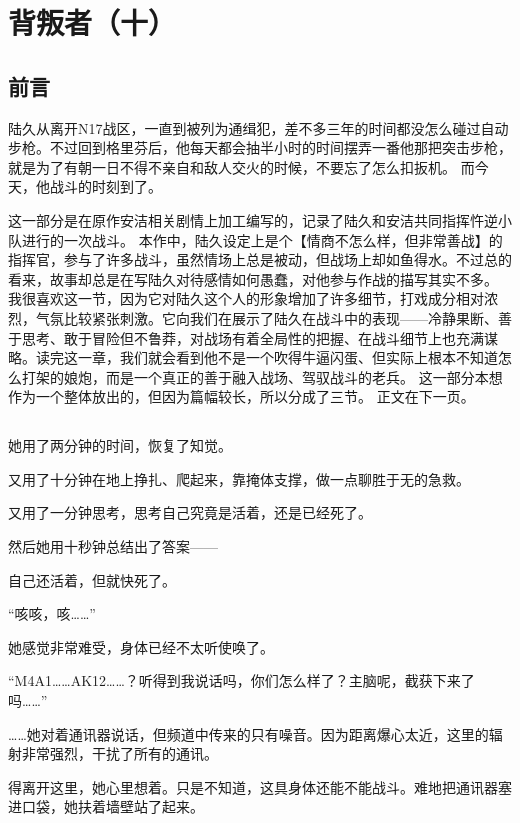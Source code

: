\chapter{背叛者（十）}

\section*{前言}
陆久从离开N17战区，一直到被列为通缉犯，差不多三年的时间都没怎么碰过自动步枪。不过回到格里芬后，他每天都会抽半小时的时间摆弄一番他那把突击步枪，就是为了有朝一日不得不亲自和敌人交火的时候，不要忘了怎么扣扳机。
而今天，他战斗的时刻到了。

\lineseparator


这一部分是在原作安洁相关剧情上加工编写的，记录了陆久和安洁共同指挥忤逆小队进行的一次战斗。
本作中，陆久设定上是个【情商不怎么样，但非常善战】的指挥官，参与了许多战斗，虽然情场上总是被动，但战场上却如鱼得水。不过总的看来，故事却总是在写陆久对待感情如何愚蠢，对他参与作战的描写其实不多。
我很喜欢这一节，因为它对陆久这个人的形象增加了许多细节，打戏成分相对浓烈，气氛比较紧张刺激。它向我们在展示了陆久在战斗中的表现——冷静果断、善于思考、敢于冒险但不鲁莽，对战场有着全局性的把握、在战斗细节上也充满谋略。读完这一章，我们就会看到他不是一个吹得牛逼闪蛋、但实际上根本不知道怎么打架的娘炮，而是一个真正的善于融入战场、驾驭战斗的老兵。
这一部分本想作为一个整体放出的，但因为篇幅较长，所以分成了三节。
正文在下一页。

\section*{}

她用了两分钟的时间，恢复了知觉。

又用了十分钟在地上挣扎、爬起来，靠掩体支撑，做一点聊胜于无的急救。

又用了一分钟思考，思考自己究竟是活着，还是已经死了。

然后她用十秒钟总结出了答案——

自己还活着，但就快死了。

“咳咳，咳……”

她感觉非常难受，身体已经不太听使唤了。

“M4A1……AK12……？听得到我说话吗，你们怎么样了？主脑呢，截获下来了吗……”

……她对着通讯器说话，但频道中传来的只有噪音。因为距离爆心太近，这里的辐射非常强烈，干扰了所有的通讯。

得离开这里，她心里想着。只是不知道，这具身体还能不能战斗。难地把通讯器塞进口袋，她扶着墙壁站了起来。

